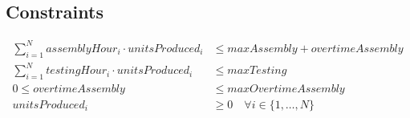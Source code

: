\documentclass{article}
\begin{document}
\subsection*{Constraints}
\begin{align*}
    \sum_{i=1}^{N} assemblyHour_i \cdot unitsProduced_i & \leq maxAssembly + overtimeAssembly \\
    \sum_{i=1}^{N} testingHour_i \cdot unitsProduced_i & \leq maxTesting \\
    0 \leq overtimeAssembly & \leq maxOvertimeAssembly \\
    unitsProduced_i & \geq 0 \quad \forall i \in \{1, \ldots, N\} \\
\end{align*}
\end{document}
